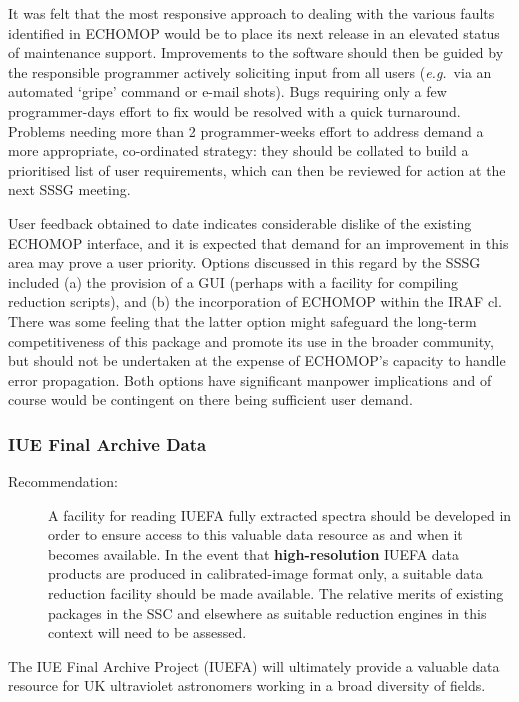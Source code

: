 It was felt that the most responsive approach to dealing with the
various faults identified in ECHOMOP would be to place its next
release in an elevated status of maintenance support.  Improvements to
the software should then be guided by the responsible programmer
actively soliciting input from all users ({\em e.g.}\ via an automated
`gripe' command or e-mail shots).  Bugs requiring only a few
programmer-days effort to fix would be resolved with a quick
turnaround.  Problems needing more than 2 programmer-weeks effort to
address demand a more appropriate, co-ordinated strategy: they should
be collated to build a prioritised list of user requirements, which
can then be reviewed for action at the next SSSG meeting.

User feedback obtained to date indicates considerable dislike of the existing 
ECHOMOP interface, and it is expected that demand for an improvement
in this area may prove a user priority.  Options discussed in this
regard by the SSSG included (a) the provision of a GUI (perhaps with a
facility for compiling reduction scripts), and (b) the incorporation
of ECHOMOP within the IRAF cl.  There was some feeling that the latter
option might safeguard the long-term competitiveness of this package
and promote its use in the broader community, but should not be
undertaken at the expense of ECHOMOP's capacity to handle error
propagation. Both options have significant manpower implications and
of course would be contingent on there being sufficient user demand.

\subsubsection{IUE Final Archive Data}

\begin{description}
\item[Recommendation:]
A facility for reading IUEFA fully extracted spectra should be
developed in order to ensure access to this valuable data resource as
and when it becomes available. In the event that {\bf high-resolution}
IUEFA data products are produced in calibrated-image format only, a
suitable data reduction facility should be made available. The
relative merits of existing packages in the SSC and elsewhere as
suitable reduction engines in this context will need to be assessed.
\end{description}

The IUE Final Archive Project (IUEFA) will ultimately provide a
valuable data resource for UK ultraviolet astronomers working in a
broad diversity of fields.

